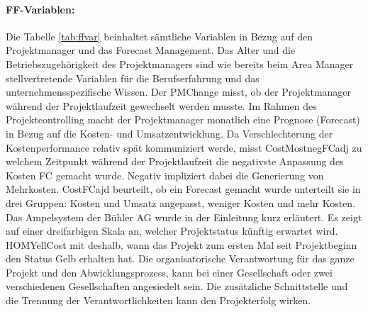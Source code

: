 \paragraph{FF-Variablen:}  Die Tabelle \ref{tab:ffvar} beinhaltet sämtliche  Variablen in Bezug auf den Projektmanager und das Forecast Management. Das Alter und die Betriebszugehörigkeit des Projektmanagers sind wie bereits beim Area Manager stellvertretende Variablen für die Berufserfahrung und das unternehmensspezifische Wissen. Der PMChange misst, ob der Projektmanager während der Projektlaufzeit gewechselt werden musste.
\newline Im Rahmen des Projektcontrolling macht der Projektmanager monatlich eine Prognose (Forecast) in Bezug auf die Kosten- und Umsatzentwicklung. Da Verschlechterung der Kostenperformance relativ spät kommuniziert werde, misst CostMostnegFCadj zu welchem Zeitpunkt während der Projektlaufzeit die negativste Anpassung des Kosten FC gemacht wurde. Negativ impliziert dabei die Generierung von Mehrkosten. CostFCajd beurteilt, ob ein Forecast gemacht wurde unterteilt sie in drei Gruppen: Kosten und Umsatz angepasst, weniger Kosten und mehr Kosten. Das Ampelsystem der Bühler AG wurde in der Einleitung kurz erläutert. Es zeigt auf einer dreifarbigen Skala an, welcher Projektstatus künftig erwartet wird. HOMYellCost mit deshalb, wann das Projekt zum ersten Mal seit Projektbeginn den Status Gelb erhalten hat. Die organisatorische Verantwortung für das ganze Projekt und den Abwicklungsprozess, kann bei einer Gesellschaft oder zwei verschiedenen Gesellschaften angesiedelt sein. Die zusätzliche Schnittstelle und die Trennung der Verantwortlichkeiten kann den Projekterfolg wirken.
